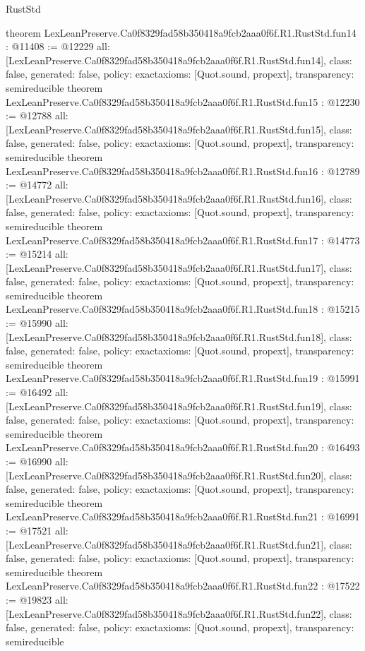 \begin{lexlean}{RustStd}
\begin{coremodule}
{}
theorem LexLeanPreserve.Ca0f8329fad58b350418a9fcb2aaa0f6f.R1.RustStd.fun14 : @11408 := @12229 {
  all: [LexLeanPreserve.Ca0f8329fad58b350418a9fcb2aaa0f6f.R1.RustStd.fun14],
  class: false,
  generated: false,
  policy: exact{axioms: [Quot.sound, propext]},
  transparency: semireducible
}
theorem LexLeanPreserve.Ca0f8329fad58b350418a9fcb2aaa0f6f.R1.RustStd.fun15 : @12230 := @12788 {
  all: [LexLeanPreserve.Ca0f8329fad58b350418a9fcb2aaa0f6f.R1.RustStd.fun15],
  class: false,
  generated: false,
  policy: exact{axioms: [Quot.sound, propext]},
  transparency: semireducible
}
theorem LexLeanPreserve.Ca0f8329fad58b350418a9fcb2aaa0f6f.R1.RustStd.fun16 : @12789 := @14772 {
  all: [LexLeanPreserve.Ca0f8329fad58b350418a9fcb2aaa0f6f.R1.RustStd.fun16],
  class: false,
  generated: false,
  policy: exact{axioms: [Quot.sound, propext]},
  transparency: semireducible
}
theorem LexLeanPreserve.Ca0f8329fad58b350418a9fcb2aaa0f6f.R1.RustStd.fun17 : @14773 := @15214 {
  all: [LexLeanPreserve.Ca0f8329fad58b350418a9fcb2aaa0f6f.R1.RustStd.fun17],
  class: false,
  generated: false,
  policy: exact{axioms: [Quot.sound, propext]},
  transparency: semireducible
}
theorem LexLeanPreserve.Ca0f8329fad58b350418a9fcb2aaa0f6f.R1.RustStd.fun18 : @15215 := @15990 {
  all: [LexLeanPreserve.Ca0f8329fad58b350418a9fcb2aaa0f6f.R1.RustStd.fun18],
  class: false,
  generated: false,
  policy: exact{axioms: [Quot.sound, propext]},
  transparency: semireducible
}
theorem LexLeanPreserve.Ca0f8329fad58b350418a9fcb2aaa0f6f.R1.RustStd.fun19 : @15991 := @16492 {
  all: [LexLeanPreserve.Ca0f8329fad58b350418a9fcb2aaa0f6f.R1.RustStd.fun19],
  class: false,
  generated: false,
  policy: exact{axioms: [Quot.sound, propext]},
  transparency: semireducible
}
theorem LexLeanPreserve.Ca0f8329fad58b350418a9fcb2aaa0f6f.R1.RustStd.fun20 : @16493 := @16990 {
  all: [LexLeanPreserve.Ca0f8329fad58b350418a9fcb2aaa0f6f.R1.RustStd.fun20],
  class: false,
  generated: false,
  policy: exact{axioms: [Quot.sound, propext]},
  transparency: semireducible
}
theorem LexLeanPreserve.Ca0f8329fad58b350418a9fcb2aaa0f6f.R1.RustStd.fun21 : @16991 := @17521 {
  all: [LexLeanPreserve.Ca0f8329fad58b350418a9fcb2aaa0f6f.R1.RustStd.fun21],
  class: false,
  generated: false,
  policy: exact{axioms: [Quot.sound, propext]},
  transparency: semireducible
}
theorem LexLeanPreserve.Ca0f8329fad58b350418a9fcb2aaa0f6f.R1.RustStd.fun22 : @17522 := @19823 {
  all: [LexLeanPreserve.Ca0f8329fad58b350418a9fcb2aaa0f6f.R1.RustStd.fun22],
  class: false,
  generated: false,
  policy: exact{axioms: [Quot.sound, propext]},
  transparency: semireducible
}
\end{coremodule}
\end{lexlean}
